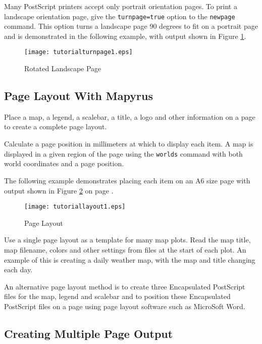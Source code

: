 Many PostScript printers accept only portrait orientation pages.
To print a landscape orientation page, 
give the \texttt{turnpage=true} option to the \texttt{newpage} command.
This option turns a landscape page 90 degrees to fit on a portrait page
and is demonstrated in the following example,
with output shown in Figure \ref{tutorialturnpage1}.



\begin{figure}[htb]
\texttt{[image: tutorialturnpage1.eps]}
\caption{Rotated Landscape Page}
\label{tutorialturnpage1}
\end{figure}

\subsection{Page Layout With Mapyrus}

Place a map, a legend, a scalebar, a title, a logo and other information on
a page to create a complete page layout.

Calculate a page position in millimeters at which to display each item.
A map is displayed in a given region of the page using
the \texttt{worlds} command with both world coordinates
and a page position.

The following example demonstrates placing each item on an A6 size
page with output shown in Figure \ref{tutoriallayout1}
on page \pageref{tutoriallayout1}.



\begin{figure}[htb]
\texttt{[image: tutoriallayout1.eps]}
\caption{Page Layout}
\label{tutoriallayout1}
\end{figure}

Use a single page layout as a template for many map plots.  Read the map title,
map filename, colors and other settings from files at the start of each plot.
An example of this is creating a daily weather map, with the map and title
changing each day.

An alternative page layout method is to create three Encapsulated PostScript
files for the map, legend and scalebar and to position these Encapsulated
PostScript files on a page using page layout software such as MicroSoft Word.

\subsection{Creating Multiple Page Output}

